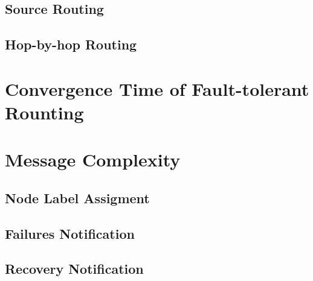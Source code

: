     \subsection{Source Routing}

    \subsection{Hop-by-hop Routing}

\section{Convergence Time of Fault-tolerant Rounting}

\section{Message Complexity}

    \subsection{Node Label Assigment}

    \subsection{Failures Notification}

    \subsection{Recovery Notification}


